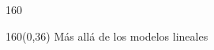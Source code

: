\documentclass[shownotes,aspectratio=169]{beamer}
\begin{document}
\begin{frame}[plain]
{\begin{textblock}{160}
\end{textblock}
}



\end{frame}


\begin{frame}[plain]
\begin{textblock}{160}(0,36) \centering
\huge Más allá de los modelos lineales
\end{textblock}
\end{frame}
\end{document}
